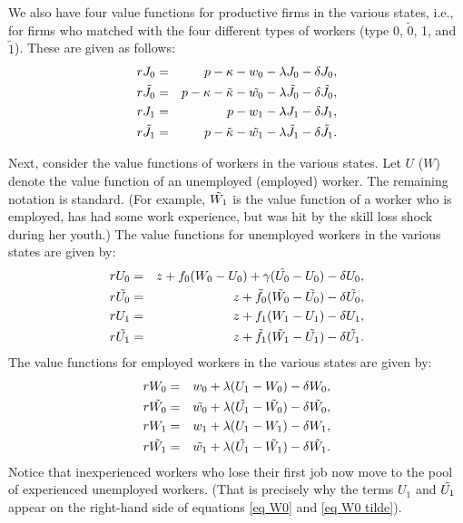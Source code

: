 \documentclass[12pt]{article} %
\theoremstyle{definition}
\begin{document}
We also have four value functions for productive firms in the various states, i.e., for firms who matched with the four different types of workers (type 0, $\tilde{0}$, 1, and $\tilde{1}$). These are given as follows:   
\begin{eqnarray}
    rJ_0 &=&p-\kappa-w_0-\lambda J_0 - \delta J_0,\label{eq J0} \\
    r\Tilde{J_0} &=&p-\kappa-\Tilde{\kappa}-\Tilde{w_0}-\lambda \Tilde{J_0} - \delta \Tilde{J_0},\label{eq J0 tilde}\\
    rJ_1 &=&p-w_1-\lambda J_1 - \delta J_1, \label{eq J1} \\
        r\Tilde{J_1} &=&p-\Tilde{\kappa}-\Tilde{w_1}-\lambda \Tilde{J_1} - \delta \Tilde{J_1} . \label{eq J1 tilde}
    \end{eqnarray}

Next, consider the value functions of workers in the various states. Let $U$ ($W$) denote the value function of an unemployed (employed) worker. The remaining notation is standard. (For example, $\Tilde{W_1}$ is the value function of a worker who is employed, has had some work experience, but was hit by the skill loss shock during her youth.) The value functions for unemployed workers in the various states are given by: 
\begin{eqnarray}
    rU_0 &=& z+f_0(W_0-U_0)+\gamma(\Tilde{U_0}-U_0) - \delta U_0, \label{eq U0} \\
    r\Tilde{U_0} &=& z+\Tilde{f_0}(\Tilde{W_0}-\Tilde{U_0})- \delta \Tilde{U_0}, \label{eq U0 tilde}\\
    rU_1 &=& z+f_1(W_1-U_1)- \delta U_1, \label{eq U1}\\
    r\Tilde{U_1} &=& z+\Tilde{f_1}(\Tilde{W_1}-\Tilde{U_1})- \delta \Tilde{U_1}. \label{eq U1 tilde} 
\end{eqnarray}
The value functions for employed workers in the various states are given by: 
\begin{eqnarray}
    rW_0 &=&w_0+\lambda(U_1-W_0)- \delta W_0, \label{eq W0} \\
     r\Tilde{W_0} &=& \Tilde{w_0}+\lambda(\Tilde{U_1}-\Tilde{W_0})- \delta \Tilde{W_0}, \label{eq W0 tilde} \\
     rW_1 &=& w_1+\lambda(U_1-W_1)- \delta W_1, \label{eq W1} \\
     r\Tilde{W_1} &=& \Tilde{w_1}+\lambda(\Tilde{U_1}-\Tilde{W_1})- \delta \Tilde{W_1}. \label{eq W1 tilde}
     \end{eqnarray}
Notice that inexperienced workers who lose their first job now move to the pool of experienced unemployed workers. (That is precisely why the terms $U_1$ and $\Tilde{U_1}$ appear on the right-hand side of equations \ref{eq W0} and \ref{eq W0 tilde}).  
\end{document}

